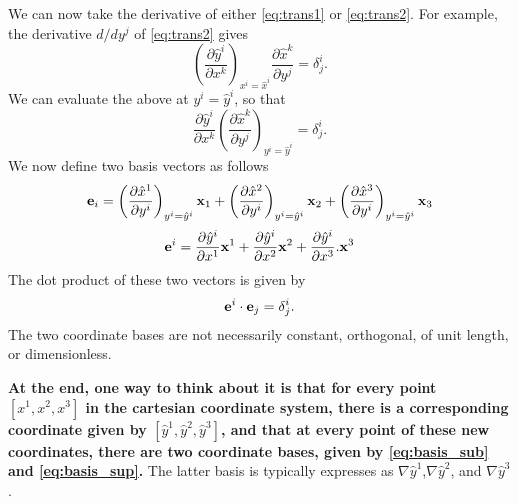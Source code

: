 \documentclass[11pt]{article}
\newcommand{\yhat}{\hat{y}}
\newcommand{\xhat}{\hat{x}}
\begin{document}
We can now take the derivative of either \cref{eq:trans1} or \cref{eq:trans2}. For example, the derivative $d/dy^j$ of \cref{eq:trans2} gives
\begin{equation}
    \left( \frac{\partial \yhat^i}{\partial x^k} \right)_{x^i = \xhat^i} \frac{\partial \xhat^k}{\partial y^j} = \delta^i_j.
\end{equation}
We can evaluate the above at $y^i = \yhat^i$, so that
\begin{equation}
     \frac{\partial \yhat^i}{\partial x^k} \left( \frac{\partial \xhat^k}{\partial y^j} \right)_{y^i = \yhat^i} = \delta^i_j.
\end{equation}
We now define two basis vectors as follows
\begin{equation}
\label{eq:basis_sub}
    \evec_i = \left( \frac{ \partial \xhat^1}{\partial y^i} \right)_{y^i = \yhat^i} \xvec_1 + \left( \frac{ \partial \xhat^2}{\partial y^i} \right)_{y^i = \yhat^i} \xvec_2 + \left( \frac{ \partial \xhat^3}{\partial y^i} \right)_{y^i = \yhat^i} \xvec_3
\end{equation}
\begin{equation}
\label{eq:basis_sup}
    \evec^i = \frac{ \partial \yhat^i}{\partial x^1} \xvec^1 + \frac{ \partial \yhat^i}{\partial x^2} \xvec^2 + \frac{ \partial \yhat^i}{\partial x^3}. \xvec^3
\end{equation}
The dot product of these two vectors is given by
\begin{equation}
\label{eq:basis_orthogonality}
    \mathbf{e}^i \cdot \mathbf{e}_j = \delta^i_j.
\end{equation}
The two coordinate bases are not necessarily constant, orthogonal, of unit length, or dimensionless.

\textbf{At the end, one way to think about it is that for every point $[x^1,x^2,x^3]$ in the cartesian coordinate system, there is a corresponding coordinate given by $[\yhat^1,\yhat^2,\yhat^3]$, and that at every point of these new coordinates, there are two coordinate bases, given by \cref{eq:basis_sub} and \cref{eq:basis_sup}.} The latter basis is typically expresses as $\nabla \yhat^1$,$\nabla \yhat^2$, and $\nabla \yhat^3$.
\end{document}
